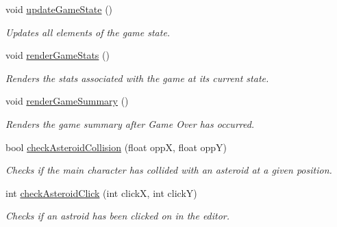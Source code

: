 \begin{DoxyCompactItemize}
\mbox{\label{class_tool_ac20a79c6fc9e569b6d0655c0d5cf43a9}} 
void \mbox{\hyperlink{class_tool_ac20a79c6fc9e569b6d0655c0d5cf43a9}{update\+Game\+State}} ()
\begin{DoxyCompactList}\small\item\em Updates all elements of the game state. \end{DoxyCompactList}\item 
\mbox{\label{class_tool_a218adc106689c268c8309cd7b88cb49b}} 
void \mbox{\hyperlink{class_tool_a218adc106689c268c8309cd7b88cb49b}{render\+Game\+Stats}} ()
\begin{DoxyCompactList}\small\item\em Renders the stats associated with the game at its current state. \end{DoxyCompactList}\item 
\mbox{\label{class_tool_a8a4546fdf12c93890d65eb165efd1bbb}} 
void \mbox{\hyperlink{class_tool_a8a4546fdf12c93890d65eb165efd1bbb}{render\+Game\+Summary}} ()
\begin{DoxyCompactList}\small\item\em Renders the game summary after Game Over has occurred. \end{DoxyCompactList}\item 
\mbox{\label{class_tool_a12ea92129c694e8c81f31b0fb0e4ed2c}} 
bool \mbox{\hyperlink{class_tool_a12ea92129c694e8c81f31b0fb0e4ed2c}{check\+Asteroid\+Collision}} (float oppX, float oppY)
\begin{DoxyCompactList}\small\item\em Checks if the main character has collided with an asteroid at a given position. \end{DoxyCompactList}\item 
\mbox{\label{class_tool_a1d546cc74d4411757cb122923a256bcf}} 
int \mbox{\hyperlink{class_tool_a1d546cc74d4411757cb122923a256bcf}{check\+Asteroid\+Click}} (int clickX, int clickY)
\begin{DoxyCompactList}\small\item\em Checks if an astroid has been clicked on in the editor. \end{DoxyCompactList}\end{DoxyCompactItemize}
